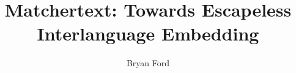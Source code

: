 \documentclass[fullpage,twocolumn]{article}
\begin{document}
\title{Matchertext: Towards Escapeless Interlanguage Embedding}

\author{Bryan Ford}

\maketitle












\arxiv{

}{

}
\end{document}
